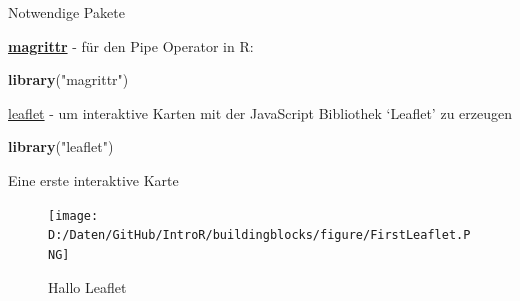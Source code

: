 \documentclass[ignorenonframetext,]{beamer}
\newenvironment{Shaded}{\begin{snugshade}}{\end{snugshade}}
\newcommand{\KeywordTok}[1]{\textcolor[rgb]{0.26,0.66,0.93}{\textbf{#1}}}
\newcommand{\StringTok}[1]{\textcolor[rgb]{0.02,0.61,0.04}{#1}}
\newcommand{\OperatorTok}[1]{\textcolor[rgb]{0.74,0.68,0.62}{#1}}
\newcommand{\NormalTok}[1]{\textcolor[rgb]{0.74,0.68,0.62}{#1}}
\begin{document}
\begin{frame}[fragile]{Notwendige Pakete}

\begin{block}{\href{https://cran.r-project.org/web/packages/magrittr/index.html}{\textbf{magrittr}}
- für den Pipe Operator in R:}

\begin{Shaded}
\begin{Highlighting}[]
\KeywordTok{library}\NormalTok{(}\StringTok{"magrittr"}\NormalTok{)}
\end{Highlighting}
\end{Shaded}

\href{https://rstudio.github.io/leaflet/}{leaflet} - um interaktive
Karten mit der JavaScript Bibliothek `Leaflet' zu erzeugen

\begin{Shaded}
\begin{Highlighting}[]
\KeywordTok{library}\NormalTok{(}\StringTok{"leaflet"}\NormalTok{)}
\end{Highlighting}
\end{Shaded}

\end{block}

\end{frame}

\begin{frame}[fragile]{Eine erste interaktive Karte}

\begin{Shaded}
\end{Shaded}

\begin{figure}
\centering
\texttt{[image: D:/Daten/GitHub/IntroR/buildingblocks/figure/FirstLeaflet.PNG]}
\caption{Hallo Leaflet}
\end{figure}

\end{frame}
\end{document}
